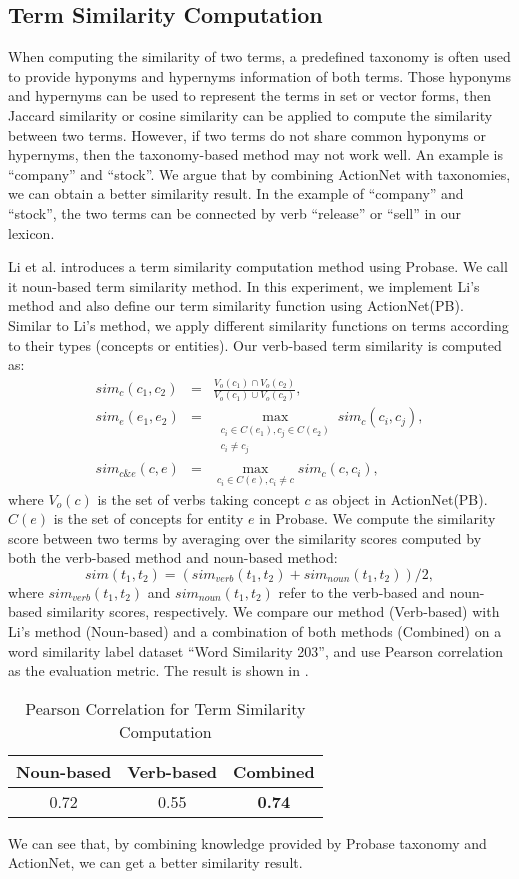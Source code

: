 \subsection{Term Similarity Computation}
\label{sec:sim}
When computing the similarity of two terms, a predefined taxonomy is often used to provide
hyponyms and hypernyms information of both terms.
Those hyponyms and hypernyms can be used to represent the terms in
set or vector forms, then Jaccard similarity or cosine similarity
can be applied to compute the similarity between two terms.
However, if two terms do not share common hyponyms or
hypernyms, then the taxonomy-based method may not work well.
An example is ``company'' and ``stock''.
We argue that by combining ActionNet with taxonomies, we
can obtain a better similarity result. In the example of ``company'' and
``stock'', the two terms can be connected by verb ``release'' or ``sell''
in our lexicon.

Li et al.\cite{LiWZWW13} introduces a term similarity computation method
using Probase. We call it noun-based term similarity method.
In this experiment, we implement Li's method and also define our term similarity
function using ActionNet(PB).
Similar to Li's method, we apply different similarity
functions on terms according to their types (concepts or entities).
Our verb-based term similarity is computed as:
\begin{eqnarray*}
sim_{c}(c_1,c_2) &=& \frac{V_o(c_1)\cap V_o(c_2)}{V_o(c_1)\cup V_o(c_2)}, \\
sim_{e}(e_1,e_2) &=& \max_{\substack{c_i\in C(e_1),c_j\in C(e_2)\\c_i\neq c_j}}sim_{c}(c_i,c_j), \\
sim_{c\&e}(c,e) &=& \max_{c_i\in C(e),c_i\neq c}sim_c(c,c_i),
\end{eqnarray*}
where $V_o(c)$ is the set of verbs taking concept $c$ as object in ActionNet(PB).
$C(e)$ is the set of concepts for entity $e$ in Probase.
We compute the similarity score between two terms by
averaging over the similarity scores computed by both
the verb-based method and noun-based method:
$$
sim(t_1,t_2)=(sim_{verb}(t_1,t_2)+sim_{noun}(t_1,t_2))/2,
$$
where $sim_{verb}(t_1,t_2)$ and $sim_{noun}(t_1,t_2)$ refer to the verb-based and noun-based similarity scores,
respectively.
We compare our method (Verb-based) with Li's method (Noun-based) and a combination of both
methods (Combined) on a word similarity label dataset
``Word Similarity 203''\cite{LiWZWW13}, and use Pearson correlation as the evaluation metric.
The result is shown in .
\begin{table}[th]
\centering
\scriptsize
\caption{Pearson Correlation for Term Similarity Computation}
\begin{tabular}{|c|c|c|}
\hline
Noun-based & Verb-based & Combined \\
\hline
\hline
0.72 & 0.55 & {\bf 0.74} \\
\hline
\end{tabular}
\label{tab:sim}
\end{table}

We can see that, by combining knowledge provided by
Probase taxonomy and ActionNet,
we can get a better similarity result.

